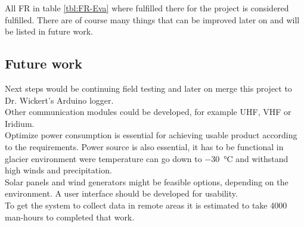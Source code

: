All FR in table \ref{tbl:FR-Eva} where fulfilled there for the project is considered fulfilled. There are of course many things that can be improved later on and will be listed in future work.

\subsection*{Future work}

Next steps would be continuing field testing and later on merge this project to Dr. Wickert's Arduino logger. \\
Other communication modules could be developed, for example UHF, VHF or Iridium.\\
Optimize power consumption is essential for achieving usable product according to the requirements. Power source is also essential, it has to be functional in glacier environment were temperature can go down to \SI{-30}{\celsius} and withstand high winds and precipitation. \\
Solar panels and wind generators might be feasible options, depending on the environment.  
A user interface should be developed for usability. \\
To get the system to collect data in remote areas it is estimated to take 4000 man-hours to completed that work.